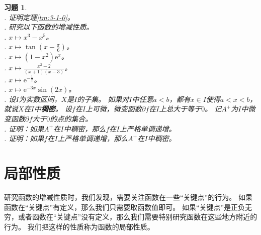 \documentclass[12pt,UTF8]{ctexbook}
\theoremstyle{definition}
\theoremstyle{plain}
\newtheorem{xt}{习题}[section]
\begin{document}
\begin{xt}
    \mbox{} \\
    . 证明定理\ref{tm:3-1-0}。\\
    . 研究以下函数的增减性质。\\
    . $x\mapsto x^3 - x^5$。\\
    . $x\mapsto \tan{\left(x - \frac{\pi}{6}\right)}$。\\
    . $x\mapsto (1 - x^2) \mathrm{e}^x$。\\
    . $x\mapsto \frac{x^2 - 2}{(x + 1)(x - 3)}$。\\
    . $x\mapsto \mathrm{e}^{-\frac{1}{x}}$。\\
    . $x\mapsto \mathrm{e}^{-3x} \sin{(2x)}$。\\
    . 设$I$为实数区间，$X$是$I$的子集。
    如果对$I$中任意$a < b$，都有$x\in I$使得$a<x<b$，就说$X$在$I$中\textbf{稠密}。
    设$f$在$I$上可微，微变函数$\partial f$在$I$上总大于等于$0$。
    记$A^+$为$I$中微变函数$\partial f$大于$0$的点的集合。\\
    . 证明：如果$A^+$在$I$中稠密，那么$f$在$I$上严格单调递增。\\
    . 证明：如果$f$在$I$上严格单调递增，那么$A^+$在$I$中稠密。
    
\end{xt}


 \section{局部性质}

研究函数的增减性质时，我们发现，需要关注函数在一些“关键点”的行为。
如果函数在“关键点”有定义，那么我们只需要取函数值即可。
如果“关键点”是正负无穷，或者函数在“关键点”没有定义，那么我们需要特别研究函数在这些地方附近的行为。
我们把这样的性质称为函数的局部性质。
\end{document}
